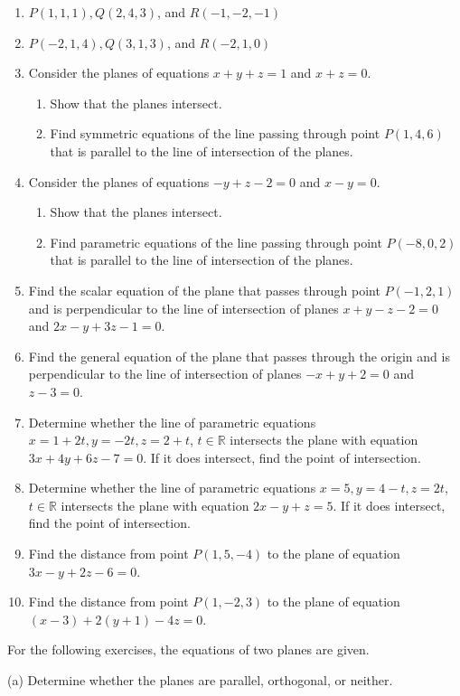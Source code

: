 \documentclass{exercises}
\begin{document}
\begin{enumerate}[resume]
\item $P(1,1,1),Q(2,4,3)$, and $R(-1,-2,-1)$
\item $P(-2,1,4),Q(3,1,3)$, and $R(-2,1,0)$
\item Consider the planes of equations $x+y+z=1$ and $x+z=0$.
\begin{enumerate}[label=(\alph*)]
  \item Show that the planes intersect.
  \item Find symmetric equations of the line passing through point $P(1,4,6)$ that is parallel to the line of intersection of the planes.
\end{enumerate}
\item Consider the planes of equations $-y+z-2=0$ and $x-y=0$.
\begin{enumerate}[label=(\alph*)]
  \item Show that the planes intersect.
  \item Find parametric equations of the line passing through point $P(-8,0,2)$ that is parallel to the line of intersection of the planes.
\end{enumerate}
\item Find the scalar equation of the plane that passes through point $P(-1,2,1)$ and is perpendicular to the line of intersection of planes $x+y-z-2=0$ and $2x-y+3z-1=0$.
\item Find the general equation of the plane that passes through the origin and is perpendicular to the line of intersection of planes $-x+y+2=0$ and $z-3=0$.
\item Determine whether the line of parametric equations $x=1+2t,y=-2t,z=2+t$, $t\in \mathbb{R}$ intersects the plane with equation $3x+4y+6z-7=0$. If it does intersect, find the point of intersection.
\item Determine whether the line of parametric equations $x=5,y=4-t,z=2t$, $t\in \mathbb{R}$ intersects the plane with equation $2x-y+z=5$. If it does intersect, find the point of intersection.
\item Find the distance from point $P(1,5,-4)$ to the plane of equation $3x-y+2z-6=0$.
\item Find the distance from point $P(1,-2,3)$ to the plane of equation $(x-3)+2(y+1)-4z=0$.
\end{enumerate}

For the following exercises, the equations of two planes are given.


(a) Determine whether the planes are parallel, orthogonal, or neither.
\end{document}
